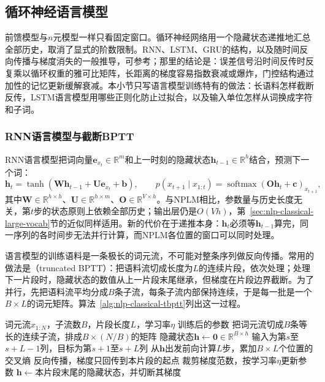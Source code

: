 \subsection{循环神经语言模型}
\label{sec:nlp-classical-rnnlm}

前馈模型与$n$元模型一样只看固定窗口。循环神经网络用一个隐藏状态递推地汇总全部历史，取消了显式的阶数限制。RNN、LSTM、GRU的结构，以及随时间反向传播与梯度消失的一般推导，可参考；那里的结论是：误差信号沿时间反传时反复乘以循环权重的雅可比矩阵，长距离的梯度容易指数衰减或爆炸，门控结构通过加性的记忆更新缓解衰减。本小节只写语言模型训练特有的做法：长语料怎样截断反传，LSTM语言模型用哪些正则化防止过拟合，以及输入单位怎样从词换成字符和子词。

\subsubsection{RNN语言模型与截断BPTT}
\label{sec:nlp-classical-rnn-bptt}

RNN语言模型把词向量$\bm e_{x_t}\in\mathbb R^{m}$和上一时刻的隐藏状态$\bm h_{t-1}\in\mathbb R^{h}$结合，预测下一个词：
\begin{equation}
  \bm h_t=\tanh(\bm W\bm h_{t-1}+\bm U\bm e_{x_t}+\bm b),\qquad
  p(x_{t+1}\mid x_{1:t})=\operatorname{softmax}(\bm O\bm h_t+\bm c)_{x_{t+1}},
  \label{eq:nlp-classical-rnn}
\end{equation}
其中$\bm W\in\mathbb R^{h\times h}$、$\bm U\in\mathbb R^{h\times m}$、$\bm O\in\mathbb R^{V\times h}$。与NPLM相比，参数量与历史长度无关，第$t$步的状态原则上依赖全部历史；输出层仍是$O(Vh)$，第~\ref{sec:nlp-classical-large-vocab}节的近似同样适用。新的代价在于递推本身：$\bm h_t$必须等$\bm h_{t-1}$算完，同一序列的各时间步无法并行计算，而NPLM各位置的窗口可以同时处理。

语言模型的训练语料是一条极长的词元流，不可能对整条序列做反向传播。常用的做法是（truncated BPTT）：把语料流切成长度为$L$的连续片段，依次处理；处理下一片段时，隐藏状态的数值从上一片段末尾继承，但梯度在片段边界截断。为了并行，先把语料流平均分成$B$条子流，每条子流内部保持连续，于是每一批是一个$B\times L$的词元矩阵。算法~\ref{alg:nlp-classical-tbptt}列出这一过程。

\begin{algorithm}[RNN语言模型的截断随时间反向传播]
  \label{alg:nlp-classical-tbptt}
  \begin{algorithmic}[1]
    \Require 词元流$x_{1:N}$，子流数$B$，片段长度$L$，学习率$\eta$
    \Ensure 训练后的参数
    \State 把词元流切成$B$条等长的连续子流，排成$B\times(N/B)$的矩阵
    \State 隐藏状态$\bm h\gets\bm 0\in\mathbb R^{B\times h}$
      \State 输入为第$s$至$s+L-1$列，目标为第$s+1$至$s+L$列
      \State 从$\bm h$出发前向计算$L$步，累加$B\times L$个位置的交叉熵
      \State 反向传播，梯度只回传到本片段的起点
      \State 裁剪梯度范数，按学习率$\eta$更新参数
      \State $\bm h\gets$本片段末尾的隐藏状态，并切断其梯度
    \EndFor
  \end{algorithmic}
\end{algorithm}

